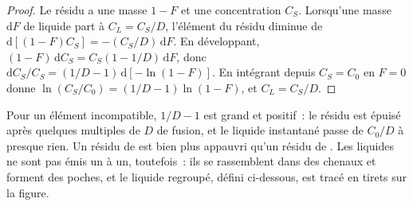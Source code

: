 \begin{proof}
Le résidu a une masse $1 - F$ et une concentration $C_S$. Lorsqu'une masse
$\mathrm dF$ de liquide part à $C_L = C_S/D$, l'élément du résidu
diminue de $\mathrm d[(1 - F)C_S] = -(C_S/D)\,\mathrm dF$. En développant,
$(1 - F)\,\mathrm dC_S = C_S(1 - 1/D)\,\mathrm dF$, donc
$\mathrm dC_S/C_S = (1/D - 1)\,\mathrm d[-\ln(1 - F)]$. En intégrant depuis
$C_S = C_0$ en $F = 0$ donne $\ln(C_S/C_0) = (1/D - 1)\ln(1 - F)$, et
$C_L = C_S/D$.
\end{proof}

Pour un élément incompatible, $1/D - 1$ est grand et positif~: le résidu est
épuisé après quelques multiples de $D$ de fusion, et le liquide instantané passe
de $C_0/D$ à presque rien. Un résidu de  est bien plus
appauvri qu'un résidu de . Les liquides ne sont pas émis un à un,
toutefois~: ils se rassemblent dans des chenaux et forment des poches, et le liquide regroupé, défini ci-dessous,
est tracé en tirets sur la figure.

